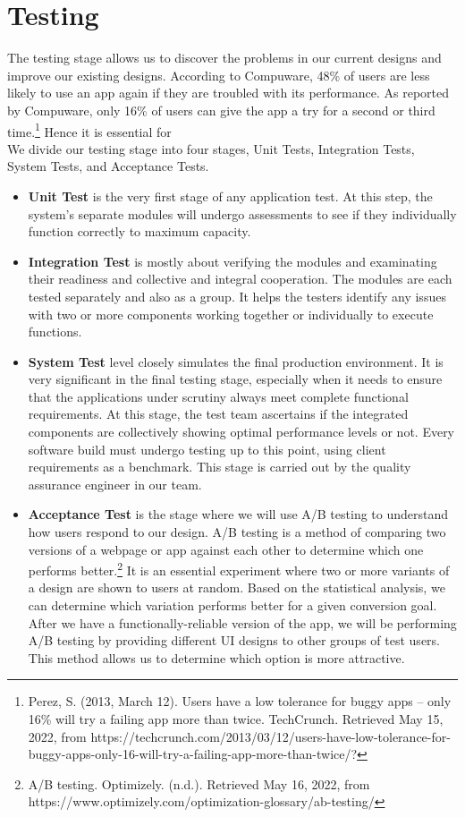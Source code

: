 \documentclass[11pt]{article}
\begin{document}
\section{Testing}
\label{ch2test}
The testing stage allows us to discover the problems in our current designs and improve our existing designs. 
According to Compuware, 48\% of users are less likely to use an app again if they are troubled with its performance.
As reported by Compuware, only 16\% of users can give the app a try for a second or third time.\footnote{Perez, S. (2013, March 12). Users have a low tolerance for buggy apps – only 16\% will try a failing app more than twice. TechCrunch. Retrieved May 15, 2022, from https://techcrunch.com/2013/03/12/users-have-low-tolerance-for-buggy-apps-only-16-will-try-a-failing-app-more-than-twice/?} Hence it is essential for 
\\We divide our testing stage into four stages, Unit Tests, Integration Tests, System Tests, and Acceptance Tests.
\begin{itemize}
\item\textbf{Unit Test} is the very first stage of any application test. At this step, the system’s separate modules will undergo assessments to see if they individually function correctly to maximum capacity. 
\item\textbf{Integration Test} is mostly about verifying the modules and examinating their readiness and collective and integral cooperation. The modules are each tested separately and also as a group. It helps the testers identify any issues with two or more components working together or individually to execute functions.
\item\textbf{System Test} level closely simulates the final production environment. It is very significant in the final testing stage, especially when it needs to ensure that the applications under scrutiny always meet complete functional requirements. 
At this stage, the test team ascertains if the integrated components are collectively showing optimal performance levels or not. Every software build must undergo testing up to this point, using client requirements as a benchmark. This stage is carried out by the quality assurance engineer in our team.
\item\textbf{Acceptance Test} is the stage where we will use A/B testing to understand how users respond to our design. 
A/B testing is a method of comparing two versions of a webpage or app against each other to determine which one performs better.\footnote{A/B testing. Optimizely. (n.d.). Retrieved May 16, 2022, from https://www.optimizely.com/optimization-glossary/ab-testing/} It is an essential experiment where two or more variants of a design are shown to users at random. Based on the statistical analysis, we can determine which variation performs better for a given conversion goal.
After we have a functionally-reliable version of the app, 
we will be performing A/B testing by providing different UI designs to other groups of test users. This method allows us to 
determine which option is more attractive.\end{itemize}
\end{document}
